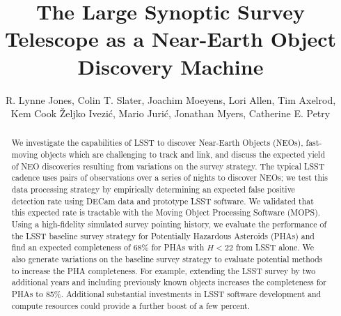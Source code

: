 \documentclass[12pt,preprint]{aastex}
\begin{document}
\title{The Large Synoptic Survey Telescope as a Near-Earth Object Discovery Machine}

\author{R. Lynne Jones,
Colin T. Slater,
Joachim Moeyens,
Lori Allen,
Tim Axelrod,
Kem Cook
\v{Z}eljko Ivezi\'{c},
Mario Juri\'{c},
Jonathan Myers,
Catherine E. Petry
}

\begin{abstract}
We investigate the capabilities of LSST to discover Near-Earth Objects (NEOs), fast-moving objects
which are challenging to track and link, and discuss the expected yield of NEO discoveries
resulting from variations on the survey strategy. The typical LSST cadence uses pairs of observations
over a series of nights to discover NEOs; we test this data processing strategy by empirically determining
an expected false positive detection rate using DECam data and prototype LSST software. We validated
that this expected rate is tractable with the Moving Object Processing Software (MOPS). Using a high-fidelity 
simulated survey pointing history, we evaluate the performance of the LSST baseline survey strategy for 
Potentially Hazardous Asteroids (PHAs) and find an expected completeness of 68\% for PHAs with $H<22$ 
from LSST alone. We also generate variations on the baseline survey strategy to evaluate potential methods 
to increase the PHA completeness. For example, extending the LSST survey by two additional years and 
including previously known objects increases the completeness for PHAs to 85\%. Additional substantial
investments in LSST software development and compute resources could provide a further boost of a
few percent. 
\end{abstract}

\end{document}
